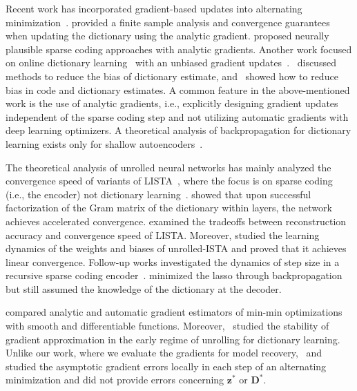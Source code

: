 \documentclass[10pt]{article} %
\newcommand{\D}{{\bm D}}
\newcommand{\z}{{\bm z}}
\begin{document}
Recent work has incorporated gradient-based updates into alternating minimization~\citep{chatterji2017alternating, arora2015sparsecoding, rambhatla2018noodl}. \citet{chatterji2017alternating} provided a finite sample analysis and convergence guarantees when updating the dictionary using the analytic gradient. \citet{arora2015sparsecoding} proposed neurally plausible sparse coding approaches with analytic gradients. Another work focused on online dictionary learning~\citep{mairal2009onlinedl} with an unbiased gradient updates~\citep{rambhatla2018noodl}.~\citet{arora2015sparsecoding} discussed methods to reduce the bias of dictionary estimate, and~\citet{rambhatla2018noodl} showed how to reduce bias in code and dictionary estimates. A common feature in the above-mentioned work is the use of analytic gradients, i.e., explicitly designing gradient updates independent of the sparse coding step and not utilizing automatic gradients with deep learning optimizers. A theoretical analysis of backpropagation for dictionary learning exists only for shallow autoencoders~\citep{rangamani2018sparseae,nguyen2019dynamics}.

The theoretical analysis of unrolled neural networks has mainly analyzed the convergence speed of variants of LISTA~\citep{gregor2010lista}, where the focus is on sparse coding (i.e., the encoder) not dictionary learning~\citep{sperchmann2012learnstruc, xin2016maxsparse, moreau2017trainsparsefactor, gires2018tradeoffconvacc, chen2018unfoldista, liu2019alista, ablin2019stepsize}. \citet{moreau2017trainsparsefactor} showed that upon successful factorization of the Gram matrix of the dictionary within layers, the network achieves accelerated convergence. \citet{gires2018tradeoffconvacc} examined the tradeoffs between reconstruction accuracy and convergence speed of LISTA. Moreover, \citet{chen2018unfoldista} studied the learning dynamics of the weights and biases of unrolled-ISTA and proved that it achieves linear convergence. Follow-up works investigated the dynamics of step size in a recursive sparse coding encoder~\citep{liu2019alista, ablin2019stepsize}. \citet{ablin2019stepsize} minimized the lasso through backpropagation but still assumed the knowledge of the dictionary at the decoder.

\citet{ablin2020super} compared analytic and automatic gradient estimators of min-min optimizations with smooth and differentiable functions. Moreover,~\citet{malezieux2022understanding} studied the stability of gradient approximation in the early regime of unrolling for dictionary learning. Unlike our work, where we evaluate the gradients for model recovery,~\citet{ablin2020super} and~\citet{malezieux2022understanding} studied the asymptotic gradient errors locally in each step of an alternating minimization and did not provide errors concerning $\z^{\ast}$ or $\D^{\ast}$.
\end{document}
